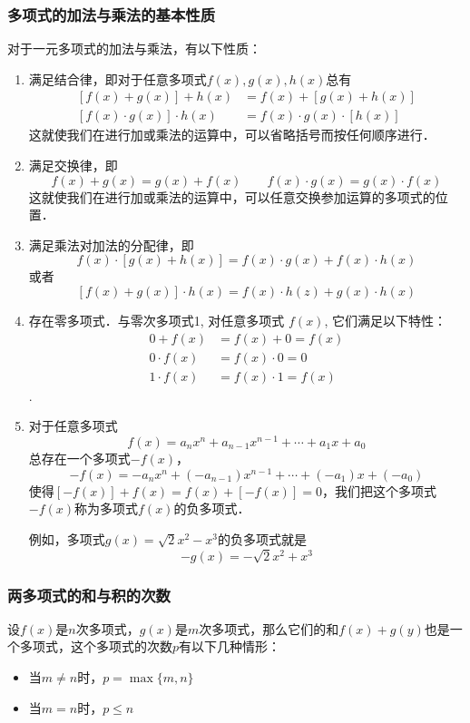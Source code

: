 \subsubsection{多项式的加法与乘法的基本性质}

对于一元多项式的加法与乘法，有以下性质：
\begin{enumerate}
    \item 满足结合律，即对于任意多项式$f(x),g(x),h(x)$总有
\[\begin{split}
   [ f (x) +g (x) ] +h (x) &=f (x) +[g (x) +h (x) ]\\
    [f (x) \cdot g (x) ] \cdot h (x) &=f (x) \cdot g (x) \cdot [h (x) ]
\end{split}\]    
这就使我们在进行加或乘法的运算中，可以省略括号而按任何顺序进行．

\item 满足交换律，即
\[f (x) +g (x) =g (x) +f(x)\qquad f (x) \cdot g (x) =g (x) \cdot f (x) \]
这就使我们在进行加或乘法的运算中，可以任意交换参加运算的多项式的位置．
\item 满足乘法对加法的分配律，即
\[f (x) \cdot  [g (x) +h (x) ] =f (x) \cdot g (x) +f(x)\cdot h(x)\]
或者 \[[f(x)+g(x)]\cdot h(x) =f(x)\cdot h(z) +g(x)\cdot h(x)\]
\item 存在零多项式．与零次多项式1, 对任意多项式
$f(x)$, 它们满足以下特性：
\[\begin{split}
    0+f (x) &=f (x) +0=f (x) \\
    0\cdot f (x) &=f (x) \cdot 0=0\\
    1\cdot f (x) &=f (x) \cdot 1=f (x) 
\end{split}\].
\item 对于任意多项式
\[f(x)=a_nx^n+a_{n-1}x^{n-1}+\cdots+a_1x+a_0\]
总存在一个多项式$-f(x)$，
\[-f(x)=-a_nx^n+(-a_{n-1})x^{n-1}+\cdots+(-a_1)x+(-a_0)\]
使得$[-f(x)]+f(x)=f(x)+[-f(x)]=0$，我们把这个多项式$-f(x)$称为多项式$f(x)$的负多项式．

例如，多项式$g(x)=\sqrt{2}x^2-x^3$的负多项式就是
\[-g(x)=-\sqrt{2}x^2+x^3\]
\end{enumerate}

\subsubsection{两多项式的和与积的次数}

设$f(x)$是$n$次多项式，$g(x)$是$m$次多项式，那么它们的和$f(x)+g(y)$也是一个多项式，这个多项式的次数$p$有以下几种情形：
\begin{itemize}
    \item 当$m\ne n$时，$p=\max\{m,n\}$
    \item 当$m=n$时，$p\le n$
\end{itemize}

